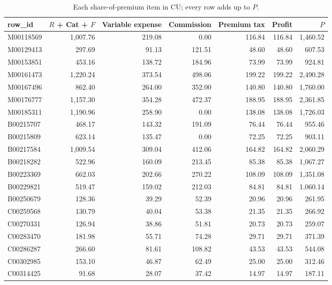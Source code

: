\begin{table}[h]
\centering
\small
\begin{tabular}{lrrrrrr}
\hline
row\_id & $R$ + Cat + $F$ & Variable expense & Commission & Premium tax & Profit & $P$\\
\hline
M00118569 & 1,007.76 & 219.08 & 0.00 & 116.84 & 116.84 & 1,460.52\\
M00129413 & 297.69 & 91.13 & 121.51 & 48.60 & 48.60 & 607.53\\
M00153851 & 453.16 & 138.72 & 184.96 & 73.99 & 73.99 & 924.81\\
M00161473 & 1,220.24 & 373.54 & 498.06 & 199.22 & 199.22 & 2,490.28\\
M00167496 & 862.40 & 264.00 & 352.00 & 140.80 & 140.80 & 1,760.00\\
M00176777 & 1,157.30 & 354.28 & 472.37 & 188.95 & 188.95 & 2,361.85\\
M00185311 & 1,190.96 & 258.90 & 0.00 & 138.08 & 138.08 & 1,726.03\\
B00215707 & 468.17 & 143.32 & 191.09 & 76.44 & 76.44 & 955.46\\
B00215809 & 623.14 & 135.47 & 0.00 & 72.25 & 72.25 & 903.11\\
B00217584 & 1,009.54 & 309.04 & 412.06 & 164.82 & 164.82 & 2,060.29\\
B00218282 & 522.96 & 160.09 & 213.45 & 85.38 & 85.38 & 1,067.27\\
B00223369 & 662.03 & 202.66 & 270.22 & 108.09 & 108.09 & 1,351.08\\
B00229821 & 519.47 & 159.02 & 212.03 & 84.81 & 84.81 & 1,060.14\\
B00250679 & 128.36 & 39.29 & 52.39 & 20.96 & 20.96 & 261.95\\
C00259568 & 130.79 & 40.04 & 53.38 & 21.35 & 21.35 & 266.92\\
C00270331 & 126.94 & 38.86 & 51.81 & 20.73 & 20.73 & 259.07\\
C00283470 & 181.98 & 55.71 & 74.28 & 29.71 & 29.71 & 371.39\\
C00286287 & 266.60 & 81.61 & 108.82 & 43.53 & 43.53 & 544.08\\
C00302985 & 153.10 & 46.87 & 62.49 & 25.00 & 25.00 & 312.46\\
C00314425 & 91.68 & 28.07 & 37.42 & 14.97 & 14.97 & 187.11\\
\hline
\end{tabular}
\caption{Each share-of-premium item in CU; every row adds up to $P$.}
\label{ov:tab-op2}
\end{table}

